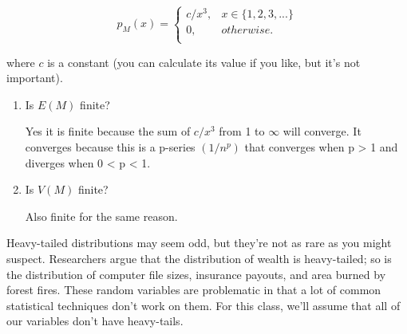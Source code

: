 \documentclass[12pt,a4paper]{article}
\numberwithin{equation}{subsection}
\begin{document}
\begin{enumerate}
$$p_M(x) = \begin{cases}
c/x^3, &x \in \{1,2,3,...\}\\
0, &otherwise.\\
\end{cases}
$$

where $c$ is a constant (you can calculate its value if you like, but it's not important).

\begin{enumerate}
\item Is $E(M)$ finite?

Yes it is finite because the sum of $c/x^3$ from 1 to $\infty$ will converge.  It converges because this is a p-series $(1/n^p)$ that converges when p > 1 and diverges when 0 < p < 1.

\item Is $V(M)$ finite?

Also finite for the same reason.

\end{enumerate}

Heavy-tailed distributions may seem odd, but they're not as rare as you might suspect.  Researchers argue that the distribution of wealth is heavy-tailed; so is the distribution of computer file sizes, insurance payouts, and area burned by forest fires.  These random variables are problematic in that a lot of common statistical techniques don't work on them.  For this class, we'll assume that all of our variables don't have heavy-tails.

\end{enumerate}
\end{document}
